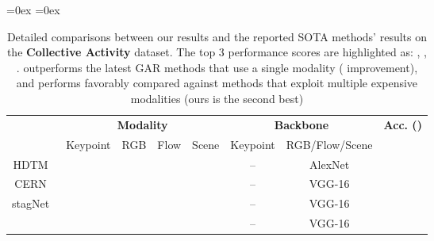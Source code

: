 \documentclass[runningheads]{llncs}
\begin{document}
 
 
 
 














 \clearpage




\begin{table*}[t]  
\fontsize{8.5pt}{8.5pt}\selectfont
   \aboverulesep=0ex
   \belowrulesep=0ex 
  \begin{center} 
  \caption{Detailed comparisons between our results and the reported SOTA methods' results on the \textbf{Collective Activity} dataset.   
The top 3 performance scores are highlighted as:
\textbf{}, , . 
\ours outperforms the latest GAR methods that use a single modality ( improvement), and performs favorably compared against methods that exploit multiple expensive modalities (ours is the second best)}
   \label{table:CAD_compare_sota_detailed}
\vspace{-10pt}
   \begin{tabular}[t]{c|c|c|c|c|c|c|c}
   \toprule
   \rule{0pt}{1.0EM} 
   \multirow{2}{*}{\textbf{Method}} & \multicolumn{4}{c|}{\textbf{Modality}}    & \multicolumn{2}{c|}{\textbf{Backbone}} &  \multirow{2}{*}{\textbf{Acc.  ()}}  \\ \cline{2-7}  
  & Keypoint & RGB & Flow & Scene & Keypoint & RGB/Flow/Scene  &    \\
   \bottomrule\rowcolor{aureolin!10}
   \rule{0pt}{1.2EM}
 HDTM~\cite{ibrahim2016hierarchical}   &            &  \tablecheck{\CheckmarkBold}    &       &        &    --   &   AlexNet &      \\ \midrule\rowcolor{aureolin!10} \rule{0pt}{1.2EM}
 CERN~\cite{cern}   &      &  \tablecheck{\CheckmarkBold}    &       &        &      --  &   VGG-16 &    \\ \midrule\rowcolor{aureolin!10} \rule{0pt}{1.2EM}
 stagNet~\cite{stagnet}      &        &  \tablecheck{\CheckmarkBold}    &       &        &    --    &   VGG-16    &  \\ \midrule\rowcolor{aureolin!10} \rule{0pt}{1.2EM}
 \cellcolor{aureolin!10}       &    \cellcolor{aureolin!10}      &  \cellcolor{aureolin!10}  \tablecheck{\CheckmarkBold}    &   \cellcolor{aureolin!10}      &   \cellcolor{aureolin!10}       &      \cellcolor{aureolin!10}  --  &   \cellcolor{aureolin!10} VGG-16 &   \cellcolor{aureolin!10}     \\

\end{tabular}
\end{center}
\end{table*}
\end{document}
